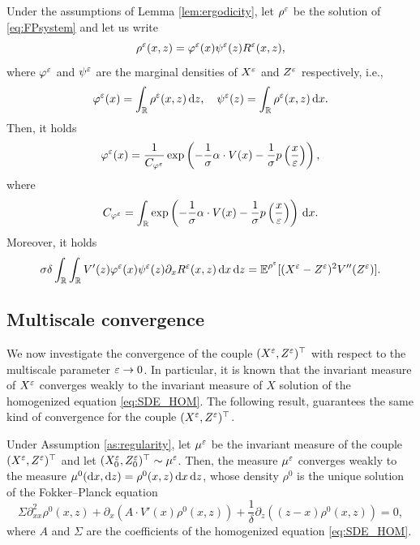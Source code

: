 \documentclass[10pt]{article}
\begin{document}
\begin{lemma}\label{lem:FPMarginal} Under the assumptions of Lemma \ref{lem:ergodicity}, let $\rho^\varepsilon$ be the solution of \eqref{eq:FPsystem} and let us write 
\begin{equation}\label{eq:densityDecomposition}
	\rho^\varepsilon(x, z) = \varphi^\varepsilon(x)\psi^\varepsilon(z)R^\varepsilon(x,z),
\end{equation}
where $\varphi^\varepsilon$ and $\psi^\varepsilon$ are the marginal densities of $X^\varepsilon$ and $Z^\varepsilon$ respectively, i.e., 
\begin{equation}
	\varphi^\varepsilon(x) = \int_{\mathbb{R}} \rho^\varepsilon(x,z) \,\mathrm{d} z, \quad  \psi^\varepsilon(z) = \int_{\mathbb{R}} \rho^\varepsilon(x,z) \,\mathrm{d} x.
\end{equation}
Then, it holds
\begin{equation}\label{eq:marginalX}
	\varphi^\varepsilon(x) = \frac{1}{C_{\varphi^\varepsilon}} \exp\left(-\frac{1}{\sigma} \alpha \cdot V(x) - \frac{1}{\sigma} p \left ( \frac{x}{\varepsilon} \right )\right),
\end{equation}
where
\begin{equation}
	C_{\varphi^\varepsilon} = \int_{\mathbb{R}} \exp\left(-\frac{1}{\sigma} \alpha \cdot V(x) - \frac{1}{\sigma} p \left ( \frac{x}{\varepsilon} \right )\right) \,\mathrm{d} x.
\end{equation}
Moreover, it holds
\begin{equation}
	\sigma \delta \int_{\mathbb{R}} \int_{\mathbb{R}} V'(z) \varphi^\varepsilon(x) \psi^\varepsilon(z) \partial_x R^\varepsilon(x,z) \,\mathrm{d} x \,\mathrm{d} z = \operatorname{\mathbb{E}}^{\rho^\varepsilon}[(X^\varepsilon - Z^\varepsilon)^2 V''(Z^\varepsilon)].
\end{equation}
\end{lemma}

\subsection{Multiscale convergence}\label{sec:convMS}

We now investigate the convergence of the couple $(X^\varepsilon, Z^\varepsilon)^\top$ with respect to the multiscale parameter $\varepsilon \to 0$. In particular, it is known that the invariant measure of $X^\varepsilon$ converges weakly to the invariant measure of $X$ solution of the homogenized equation \eqref{eq:SDE_HOM}. The following result,  guarantees the same kind of convergence for the couple $(X^\varepsilon, Z^\varepsilon)^\top$.

\begin{lemma}\label{lem:convMeasure} Under Assumption \ref{as:regularity}, let $\mu^\varepsilon$ be the invariant measure of the couple $(X^\varepsilon, Z^\varepsilon)^\top$ and let $(X_0^\varepsilon, Z_0^\varepsilon)^\top \sim \mu^\varepsilon$. Then, the measure $\mu^\varepsilon$ converges weakly to the measure $\mu^0(\mathrm{d} x, \mathrm{d} z) = \rho^0(x, z) \,\mathrm{d} x \,\mathrm{d} z$, whose density $\rho^0$ is the unique solution of the Fokker--Planck equation
\begin{equation} \label{eq:FPsystem_homogenized}
	\Sigma \partial^2_{xx} \rho^0(x,z) + \partial_x\left( A \cdot V'(x) \rho^0(x,z) \right) + \frac{1}{\delta}\partial_z\left((z - x) \rho^0(x,z) \right) = 0,
\end{equation}
where $A$ and $\Sigma$ are the coefficients of the homogenized equation \eqref{eq:SDE_HOM}.
\end{lemma}
\end{document}
